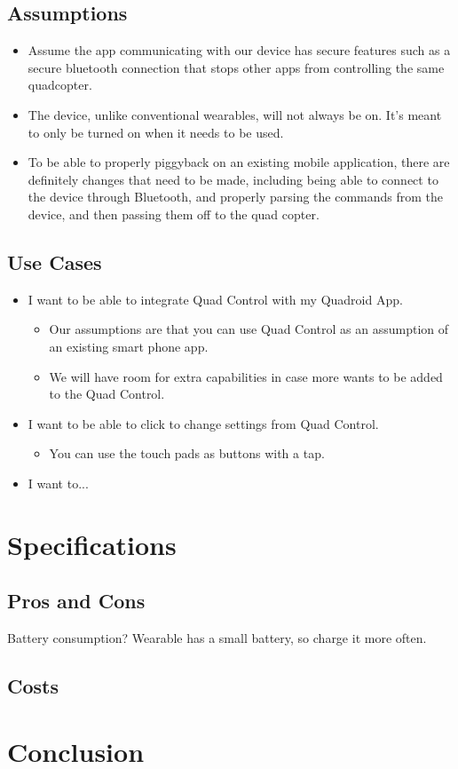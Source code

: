 \documentclass[12pt,letterpaper]{article}
\begin{document}
\subsection*{Assumptions}
\begin{itemize}
\item Assume the app communicating with our device has secure features such as a secure bluetooth connection that stops other apps from controlling the same quadcopter. 
\item The device, unlike conventional wearables, will not always be on. It’s meant to only be turned on when it needs to be used. 
\item To be able to properly piggyback on an existing  mobile application, there are definitely changes that need to be made, including being able to connect to the device through Bluetooth, and properly parsing the commands from the device, and then passing them off to the quad copter.
\end{itemize}

\subsection*{Use Cases}
\begin{itemize}
\item I want to be able to integrate Quad Control with my Quadroid App.
\begin{itemize}
\item Our assumptions are that you can use Quad Control as an assumption of an existing smart phone app.
\item We will have room for extra capabilities in case more wants to be added to the Quad Control.
\end{itemize}
\item I want to be able to click to change settings from Quad Control.
\begin{itemize}
\item You can use the touch pads as buttons with a tap.
\end{itemize}
\item I want to...
\end{itemize}



\section*{Specifications}
\subsection*{Pros and Cons}
Battery consumption?
Wearable has a small battery, so charge it more often.
\subsection*{Costs}



\section*{Conclusion}

\newpage
\nocite{*}


\end{document}
